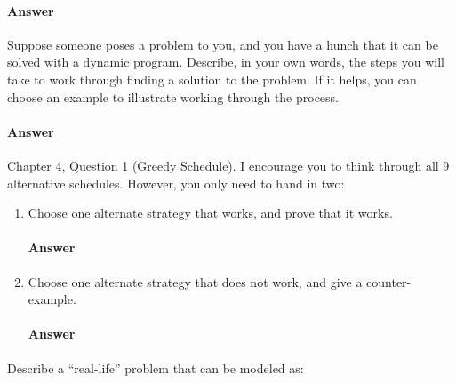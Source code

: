 \documentclass{article}
\begin{document}
\paragraph{Answer}
\todo{}

\collab{\todo{}}

Suppose someone poses a problem to you, and you have a hunch that it can be
solved with a dynamic program.  Describe, in your own words, the steps you will
take to work through finding a solution to the problem.  If it helps, you can
choose an example to illustrate working through the process.

\paragraph{Answer}
\todo{}


\collab{\todo{}}

Chapter 4, Question 1 (Greedy Schedule).  I encourage you to think through all 9
alternative schedules.  However, you only need to hand in two:
\begin{enumerate}
    \item Choose one alternate strategy that
        works, and prove that it works.

    \paragraph{Answer}
    \todo{}

    \item Choose one alternate strategy that does not work, and give a
        counter-example.

    \paragraph{Answer}
    \todo{}

\end{enumerate}

\collab{\todo{}}

Describe a ``real-life'' problem that can be modeled as:
\end{document}
